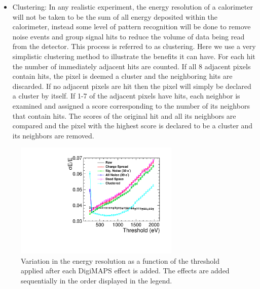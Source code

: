 \begin{itemize}
\item Clustering: In any realistic experiment, the energy resolution of a calorimeter will not be taken to be the sum of all energy deposited within the calorimeter, instead some level of pattern recognition will be done to remove noise events and group signal hits to reduce the volume of data being read from the detector. This process is referred to as clustering. Here we use a very simplistic clustering method to illustrate the benefits it can have. For each hit the number of immediately adjacent hits are counted. If all 8 adjacent pixels contain hits, the pixel is deemed a cluster and the neighboring hits are discarded. If no adjacent pixels are hit then the pixel will simply be declared a cluster by itself. If 1-7 of the adjacent pixels have hits, each neighbor is examined and assigned a score corresponding to the number of its neighbors that contain hits. The scores of the original hit and all its neighbors are compared and the pixel with the highest score is declared to be a cluster and its neighbors are removed.  
\end{itemize}

\begin{figure}
  \centering
  \includegraphics[width=0.7\textwidth,keepaspectratio]{DECALStudies/fig/ThresholdScan.pdf}
  \caption{Variation in the energy resolution as a function of the threshold applied after each DigiMAPS effect is added. The effects are added sequentially in the order displayed in the legend.}
  \label{fig:digimapseffects}
\end{figure}

